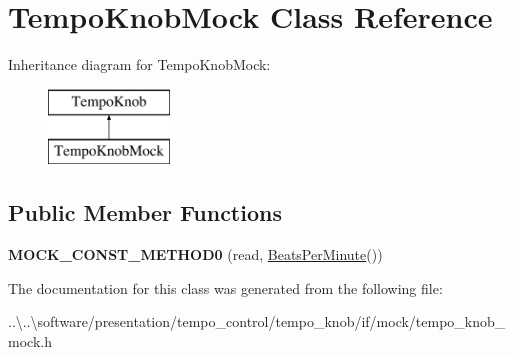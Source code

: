 \hypertarget{class_tempo_knob_mock}{}\section{Tempo\+Knob\+Mock Class Reference}
\label{class_tempo_knob_mock}
Inheritance diagram for Tempo\+Knob\+Mock\+:\begin{figure}[H]
\begin{center}
\leavevmode
\includegraphics[height=2.000000cm]{class_tempo_knob_mock}
\end{center}
\end{figure}
\subsection*{Public Member Functions}
\begin{DoxyCompactItemize}
\item 
\mbox{\label{class_tempo_knob_mock_a2d3e4d224e3972cca38277f9ed25517d}} 
{\bfseries M\+O\+C\+K\+\_\+\+C\+O\+N\+S\+T\+\_\+\+M\+E\+T\+H\+O\+D0} (read, \mbox{\hyperlink{class_beats_per_minute}{Beats\+Per\+Minute}}())
\end{DoxyCompactItemize}


The documentation for this class was generated from the following file\+:\begin{DoxyCompactItemize}
\item 
..\textbackslash{}..\textbackslash{}software/presentation/tempo\+\_\+control/tempo\+\_\+knob/if/mock/tempo\+\_\+knob\+\_\+mock.\+h\end{DoxyCompactItemize}
